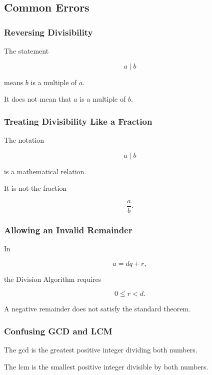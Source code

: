 \subsection{Common Errors}
\label{subsec:elementary-number-theory-common-errors}

\subsubsection{Reversing Divisibility}

The statement

\[ a\mid b \]

means \(b\) is a multiple of \(a\).

It does not mean that \(a\) is a multiple of \(b\).

\subsubsection{Treating Divisibility Like a Fraction}

The notation

\[ a\mid b \]

is a mathematical relation.

It is not the fraction

\[ \frac ab. \]

\subsubsection{Allowing an Invalid Remainder}

In

\[ a=dq+r, \]

the Division Algorithm requires

\[ 0\leq r<d. \]

A negative remainder does not satisfy the standard theorem.

\subsubsection{Confusing GCD and LCM}

The gcd is the greatest positive integer dividing both numbers.

The lcm is the smallest positive integer divisible by both numbers.

